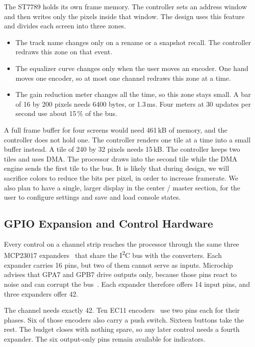 \documentclass[11pt, letterpaper,titlepage]{article}
\begin{document}
The ST7789 holds its own frame memory. The controller sets an address window
and then writes only the pixels inside that window. The design uses this
feature and divides each screen into three zones.

\begin{itemize}
    \item The track name changes only on a rename or a snapshot recall. The
          controller redraws this zone on that event.
    \item The equalizer curve changes only when the user moves an encoder. One
          hand moves one encoder, so at most one channel redraws this zone at
          a time.
    \item The gain reduction meter changes all the time, so this zone stays
          small. A bar of 16 by 200 pixels needs 6400 bytes, or 1.3\,ms. Four
          meters at 30 updates per second use about 15\,\% of the bus.
\end{itemize}

A full frame buffer for four screens would need 461\,kB of memory, and the
controller does not hold one. The controller renders one tile at a time into a
small buffer instead. A tile of 240 by 32 pixels needs 15\,kB. The controller
keeps two tiles and uses DMA. The processor draws into the second tile while
the DMA engine sends the first tile to the bus. It is likely that during design, we will sacrifice colors to reduce the bits per pixel, in order to increase framerate. We also plan to have a single, larger display in the center / master section, for the user to configure settings and save and load console states.

\subsection{GPIO Expansion and Control Hardware}


\label{ssec:gpio}

Every control on a channel strip reaches the processor through the same three
MCP23017 expanders~\cite{mcp23017} that share the I\textsuperscript{2}C bus with the converters.
Each expander carries 16 pins, but two of them cannot serve as inputs. Microchip
advises that GPA7 and GPB7 drive outputs only, because those pins react to noise
and can corrupt the bus~\cite{mcp23017}. Each expander therefore offers 14 input pins, and three
expanders offer 42.

The channel needs exactly 42. Ten EC11 encoders~\cite{ec11} use two pins each for their
phases. Six of those encoders also carry a push switch. Sixteen buttons take the
rest. The budget closes with nothing spare, so any later control needs a fourth
expander. The six output-only pins remain available for indicators.
\end{document}
